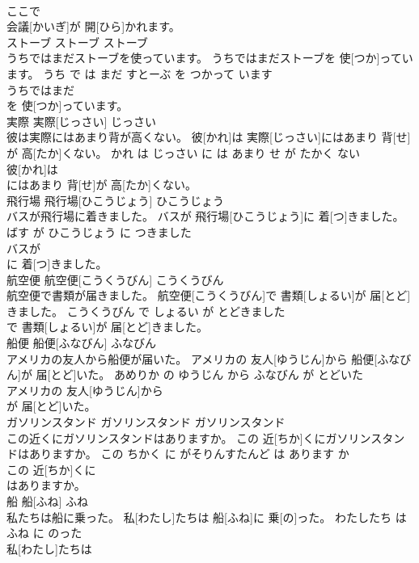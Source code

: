 \documentclass[8pt]{extreport}
\begin{document}
\begin{CJK}{UTF8}{min}
\\	ここで
\\	会議[かいぎ]が 開[ひら]かれます。			
\\	ストーブ	ストーブ	ストーブ	
\\	うちではまだストーブを使っています。	うちではまだストーブを 使[つか]っています。	うち で は まだ すとーぶ を つかって います	
\\	うちではまだ
\\	を 使[つか]っています。			
\\	実際	実際[じっさい]	じっさい	
\\	彼は実際にはあまり背が高くない。	彼[かれ]は 実際[じっさい]にはあまり 背[せ]が 高[たか]くない。	かれ は じっさい に は あまり せ が たかく ない	
\\	彼[かれ]は
\\	にはあまり 背[せ]が 高[たか]くない。			
\\	飛行場	飛行場[ひこうじょう]	ひこうじょう	
\\	バスが飛行場に着きました。	バスが 飛行場[ひこうじょう]に 着[つ]きました。	ばす が ひこうじょう に つきました	
\\	バスが
\\	に 着[つ]きました。			
\\	航空便	航空便[こうくうびん]	こうくうびん	
\\	航空便で書類が届きました。	航空便[こうくうびん]で 書類[しょるい]が 届[とど]きました。	こうくうびん で しょるい が とどきました	
\\	で 書類[しょるい]が 届[とど]きました。			
\\	船便	船便[ふなびん]	ふなびん	
\\	アメリカの友人から船便が届いた。	アメリカの 友人[ゆうじん]から 船便[ふなびん]が 届[とど]いた。	あめりか の ゆうじん から ふなびん が とどいた	
\\	アメリカの 友人[ゆうじん]から
\\	が 届[とど]いた。			
\\	ガソリンスタンド	ガソリンスタンド	ガソリンスタンド	
\\	この近くにガソリンスタンドはありますか。	この 近[ちか]くにガソリンスタンドはありますか。	この ちかく に がそりんすたんど は あります か	
\\	この 近[ちか]くに
\\	はありますか。			
\\	船	船[ふね]	ふね	
\\	私たちは船に乗った。	私[わたし]たちは 船[ふね]に 乗[の]った。	わたしたち は ふね に のった	
\\	私[わたし]たちは

\end{CJK}
\end{document}
